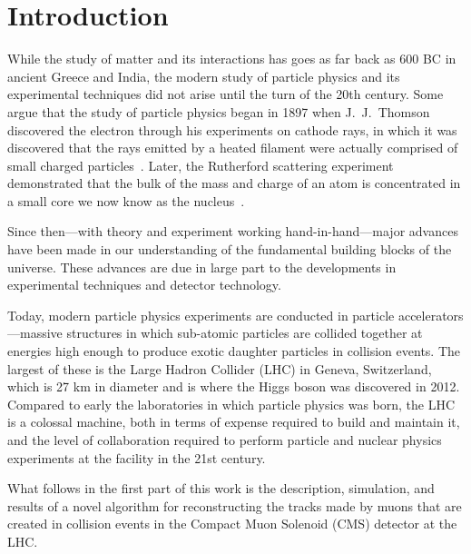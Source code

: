 
\chapter{Introduction}
While the study of matter and its interactions has goes as far back as 600 BC in ancient Greece and India, the modern study of particle physics and its experimental techniques did not arise until the turn of the 20th century.
Some argue that the study of particle physics began in 1897 when J.\ J.\ Thomson discovered the electron through his experiments on cathode rays, in which it was discovered that the rays emitted by a heated filament were actually comprised of small charged particles~\cite{GriffithsParticle}.
Later, the Rutherford scattering experiment demonstrated that the bulk of the mass and charge of an atom is concentrated in a small core we now know as the nucleus~\cite{BargerCollider}.

Since then---with theory and experiment working hand-in-hand---major advances have been made in our understanding of the fundamental building blocks of the universe.
These advances are due in large part to the developments in experimental techniques and detector technology.

Today, modern particle physics experiments are conducted in particle accelerators---massive structures in which sub-atomic particles are collided together at energies high enough to produce exotic daughter particles in collision events.
The largest of these is the Large Hadron Collider (LHC) in Geneva, Switzerland, which is 27 km in diameter and is where the Higgs boson was discovered in 2012.
Compared to early the laboratories in which particle physics was born, the LHC is a colossal machine, both in terms of expense required to build and maintain it, and the level of collaboration required to perform particle and nuclear physics experiments at the facility in the 21st century.

What follows in the first part of this work is the description, simulation, and results of a novel algorithm for reconstructing the tracks made by muons that are created in collision events in the Compact Muon Solenoid (CMS) detector at the LHC.
